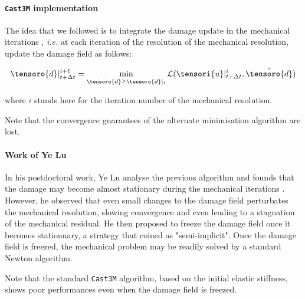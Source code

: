 \cite{miehe_phase_2010, nguyen_phase_2015, nguyen_phase-field_2016, molnar_2d_2017, molnar_open-source_2020}

\paragraph{\texttt{Cast3M} implementation}
\label{castem_implementation}

The idea that we followed is to integrate the damage update in the
mechanical iterations \cite{helfer_modelisation_2017}, \textit{i.e.} at each
iteration of the resolution of the mechanical resolution, update the
damage field as follows:


\begin{equation}
    \tensoro{d}\vert_{t + \Delta t}^{i+1} = \min_{\hat{\tensoro{d}} \geq \tensoro{d}\vert_{t}}
    \mathcal{L}(\tensori{u}\vert_{t + \Delta t}^{i}, \hat{\tensoro{d}})
\end{equation}

where $i$ stands here for the iteration number of the mechanical
resolution.

Note that the convergence guarantees of the alternate minimisation
algorithm are lost.

\paragraph{Work of Ye Lu}

In his postdoctoral work, Ye Lu analyse the previous algorithm and
founds that the damage may become almost stationary during the
mechanical iterations \cite{lu_schema_2019}. However, he observed that even
small changes to the damage field perturbates the mechanical resolution,
slowing convergence and even leading to a stagnation of the mechanical
residual. He then proposed to freeze the damage field once it becomes
stationnary, a strategy that coined as "semi-implicit". Once the damage
field is freezed, the mechanical problem may be readily solved by a
standard Newton algorithm.

Note that the standard \texttt{Cast3M} algorithm, based on the initial elastic
stiffness, shows poor performances even when the damage field is
freezed.